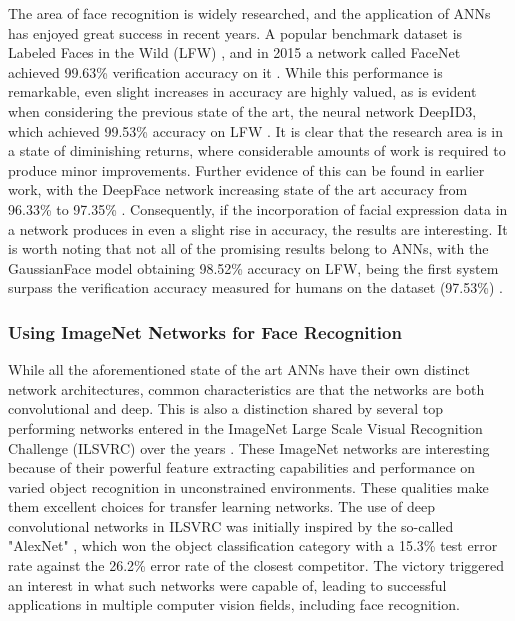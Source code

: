 The area of face recognition is widely researched, and the application of ANNs has enjoyed great success in recent years. A popular benchmark dataset is Labeled Faces in the Wild (LFW) \cite{lfw}, and in 2015 a network called FaceNet achieved 99.63\% verification accuracy on it \cite{facenet}. While this performance is remarkable, even slight increases in accuracy are highly valued, as is evident when considering the previous state of the art, the neural network DeepID3, which achieved 99.53\% accuracy on LFW \cite{deepid3}. It is clear that the research area is in a state of diminishing returns, where considerable amounts of work is required to produce minor improvements. Further evidence of this can be found in earlier work, with the DeepFace network increasing state of the art accuracy from 96.33\% to 97.35\% \cite{deepface}. Consequently, if the incorporation of facial expression data in a network produces in even a slight rise in accuracy, the results are interesting. It is worth noting that not all of the promising results belong to ANNs, with the GaussianFace model obtaining 98.52\% accuracy on LFW, being the first system surpass the verification accuracy measured for humans on the dataset (97.53\%) \cite{gaussianface}.

\subsubsection{Using ImageNet Networks for Face Recognition}

While all the aforementioned state of the art ANNs have their own distinct network architectures, common characteristics are that the networks are both convolutional and deep. This is also a distinction shared by several top performing networks entered in the ImageNet Large Scale Visual Recognition Challenge (ILSVRC) \cite{imagenet} over the years \cite{inception, vgg, googlenet}. These ImageNet networks are interesting because of their powerful feature extracting capabilities and performance on varied object recognition in unconstrained environments. These qualities make them excellent choices for transfer learning networks. The use of deep convolutional networks in ILSVRC was initially inspired by the so-called "AlexNet" \cite{alexnet}, which won the object classification category with a 15.3\% test error rate against the 26.2\% error rate of the closest competitor. The victory triggered an interest in what such networks were capable of, leading to successful applications in multiple computer vision fields, including face recognition. \\

